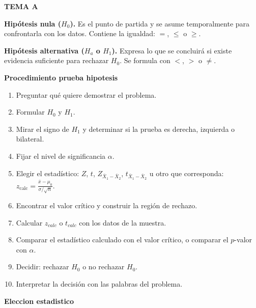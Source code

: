 \documentclass[10pt,a4paper]{article}
\begin{document}
{\large\bfseries TEMA A\par}
\vspace{2pt}

\textbf{Hipótesis nula ($H_0$).} Es el punto de partida y se asume temporalmente para confrontarla con los datos. Contiene la igualdad: $=$, $\leq$ o $\geq$.

\textbf{Hipótesis alternativa ($H_a$ o $H_1$).} Expresa lo que se concluirá si existe evidencia suficiente para rechazar $H_0$. Se formula con $<$, $>$ o $\neq$.

\vspace{3pt}
\textbf{Procedimiento prueba hipotesis}

\begin{enumerate}[label=\textbf{Paso \arabic*.},leftmargin=2cm,itemsep=0pt,topsep=1pt,parsep=0pt]
  \item Preguntar qué quiere demostrar el problema.
  \item Formular $H_0$ y $H_1$.
  \item Mirar el signo de $H_1$ y determinar si la prueba es derecha, izquierda o bilateral.
  \item Fijar el nivel de significancia $\alpha$.
  \item Elegir el estadístico: $Z$, $t$, $Z_{\bar{X}_1-\bar{X}_2}$, $t_{\bar{X}_1-\bar{X}_2}$ u otro que corresponda: $z_{\text{calc}} = \frac{\bar{x}-\mu_0}{\sigma/\sqrt{n}}$.
  \item Encontrar el valor crítico y construir la región de rechazo.
  \item Calcular $z_{calc}$ o $t_{calc}$ con los datos de la muestra.
  \item Comparar el estadístico calculado con el valor crítico, o comparar el $p$-valor con $\alpha$.
  \item Decidir: rechazar $H_0$ o no rechazar $H_0$.
  \item Interpretar la decisión con las palabras del problema.
\end{enumerate}

\vspace{3pt}
\textbf{Eleccion estadistico}
\end{document}
